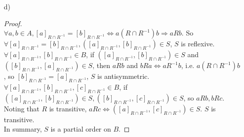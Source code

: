 \documentclass{article}
\begin{document}
\begin{itemize}
\begin{proof}
        In summary, $R \cap R^{-1}$ is an equivalence relation on $A$.
    \end{proof}
    \item [d)]
    \begin{proof}\quad \\
        $\forall a, b \in A, [a]_{R \cap R^{-1}} = [b]_{R \cap R^{-1}} \Leftrightarrow a(R \cap R^{-1})b \Rightarrow aRb$. So $\forall [a]_{R \cap R^{-1}} = [b]_{R \cap R^{-1}}, ([a]_{R \cap R^{-1}}, [b]_{R \cap R^{-1}}) \in S$, $S$ is reflexive. \\
        $\forall [a]_{R \cap R^{-1}}, [b]_{R \cap R^{-1}} \in B$, if $([a]_{R \cap R^{-1}}, [b]_{R \cap R^{-1}}) \in S$ and $([b]_{R \cap R^{-1}}, [a]_{R \cap R^{-1}}) \in S$, then $aRb$ and $bRa \Leftrightarrow aR^{-1}b$, i.e. $a(R \cap R^{-1})b$, so  $[b]_{R \cap R^{-1}} = [a]_{R \cap R^{-1}}$, $S$ is antisymmetric. \\
        $\forall [a]_{R \cap R^{-1}}, [b]_{R \cap R^{-1}}, [c]_{R \cap R^{-1}} \in B$, if $([a]_{R \cap R^{-1}}, [b]_{R \cap R^{-1}}) \in S, ([b]_{R \cap R^{-1}}, [c]_{R \cap R^{-1}}) \in S$, so $aRb, bRc$. Noting that $R$ is transitive, $aRc \Leftrightarrow ([a]_{R \cap R^{-1}}, [c]_{R \cap R^{-1}}) \in S$. $S$ is transitive. \\
        In summary, $S$ is a partial order on $B$. 
    \end{proof}
\end{itemize}
\end{document}
